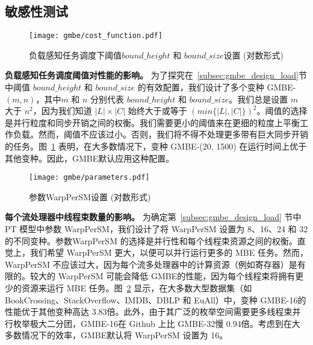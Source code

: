 \subsection{敏感性测试}
\label{subsec:gmbe_sensitivity}


\begin{figure} [H]
	\centering
  \vspace{0.1in}
	\texttt{[image: gmbe/cost\_function.pdf]}	
	\vspace{0.1in}
  \caption{负载感知任务调度下阈值$bound\_height$ 和 $bound\_size$设置 (对数形式)}
	\label{fig:gmbe_exp_cost}
\end{figure}


\textbf{负载感知任务调度阈值对性能的影响。} 为了探究在~\ref{subsec:gmbe_design_load}节中阈值 $bound\_height$ 和 $bound\_size$ 的有效配置，我们设计了多个变种 GMBE-$(m, n)$，其中$m$ 和 $n$ 分别代表 $bound\_height$ 和 $bound\_size$。我们总是设置 $m$ 大于 $n^2$，因为我们知道  $|L|\times|C|$ 始终大于或等于 $(min\{|L|,|C|\})^2$。阈值的选择是并行粒度和同步开销之间的权衡。我们需要更小的阈值来在更细的粒度上平衡工作负载。然而，阈值不应该过小。否则，我们将不得不处理更多带有巨大同步开销的任务。图~\ref{fig:gmbe_exp_cost} 表明，在大多数情况下，变种 GMBE-(20, 1500) 在运行时间上优于其他变种。因此，GMBE默认应用这种配置。


\begin{figure} [H]
	\centering
  \vspace{0.1in}
	\texttt{[image: gmbe/parameters.pdf]}	
	\vspace{0.1in}
  \caption{参数\textsf{WarpPerSM}设置 (对数形式)}
	\label{fig:gmbe_exp_config}
\end{figure}

\textbf{每个流处理器中线程束数量的影响。} 为确定第~\ref{subsec:gmbe_design_load} 节中 PT 模型中参数 \textsf{WarpPerSM}，我们设计了将 \textsf{WarpPerSM} 设置为 8、16、24 和 32 的不同变种。参数\textsf{WarpPerSM} 的选择是并行性和每个线程束资源之间的权衡。直觉上，我们希望 \textsf{WarpPerSM} 更大，以便可以并行运行更多的 MBE 任务。然而，\textsf{WarpPerSM} 不应该过大，因为每个流多处理器中的计算资源（例如寄存器）是有限的。较大的 \textsf{WarpPerSM} 可能会降低 GMBE的性能，因为每个线程束将拥有更少的资源来运行 MBE 任务。图~\ref{fig:gmbe_exp_config} 显示，在大多数大型数据集（如 BookCrossing、StackOverflow、IMDB、DBLP 和 EuAll）中，变种 GMBE-16的性能优于其他变种高达 3.83倍。此外，由于其广泛的枚举空间需要更多线程束并行枚举极大二分团，GMBE-16在 Github 上比 GMBE-32慢 0.94倍。考虑到在大多数情况下的效率，GMBE默认将 \textsf{WarpPerSM} 设置为 16。


